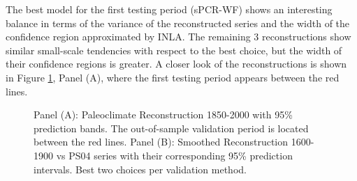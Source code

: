 \documentclass[12pt]{amsart}
\theoremstyle{plain}
\theoremstyle{definition}
\theoremstyle{remark}
\begin{document}
The best model for the first testing period (sPCR-WF) shows an interesting
balance in terms of the variance of the reconstructed series and the width of
the confidence region approximated by INLA. The remaining 3 reconstructions show
similar small-scale tendencies with respect to the best choice, but the width of
their confidence regions is greater. A closer look of the reconstructions is shown in Figure
\ref{fig:paleo19001}, Panel (A), where the first testing period appears between the red lines.
\begin{figure}[h!]
  \centering
  \caption{Panel (A): Paleoclimate Reconstruction 1850-2000 with 95\%
    prediction bands. The out-of-sample validation period is
    located between the red lines. Panel (B): Smoothed Reconstruction 1600-1900
    vs PS04 series with their corresponding 95\% prediction intervals. Best two choices per validation method.}
  \label{fig:paleo19001}
\end{figure}
\end{document}
